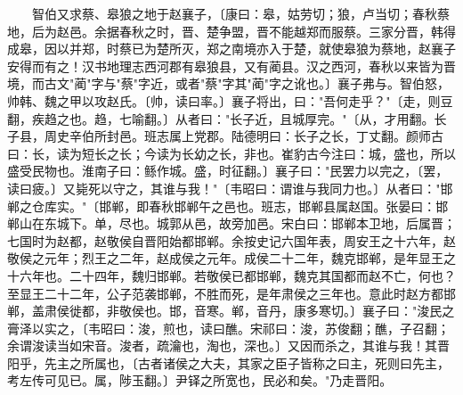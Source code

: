 　　智伯又求蔡、皋狼之地于赵襄子，〔康曰：皋，姑劳切；狼，卢当切；春秋蔡地，后为赵邑。余据春秋之时，晋、楚争盟，晋不能越郑而服蔡。三家分晋，韩得成皋，因以并郑，时蔡已为楚所灭，郑之南境亦入于楚，就使皋狼为蔡地，赵襄子安得而有之！汉书地理志西河郡有皋狼县，又有蔺县。汉之西河，春秋以来皆为晋境，而古文"蔺"字与"蔡"字近，或者"蔡"字其"蔺"字之讹也。〕襄子弗与。智伯怒，帅韩、魏之甲以攻赵氏。〔帅，读曰率。〕襄子将出，曰："吾何走乎？"〔走，则豆翻，疾趋之也。趋，七喻翻。〕从者曰："长子近，且城厚完。"〔从，才用翻。长子县，周史辛伯所封邑。班志属上党郡。陆德明曰：长子之长，丁丈翻。颜师古曰：长，读为短长之长；今读为长幼之长，非也。崔豹古今注曰：城，盛也，所以盛受民物也。淮南子曰：鲧作城。盛，时征翻。〕襄子曰："民罢力以完之，〔罢，读曰疲。〕又毙死以守之，其谁与我！"〔韦昭曰：谓谁与我同力也。〕从者曰："邯郸之仓库实。"〔邯郸，即春秋邯郸午之邑也。班志，邯郸县属赵国。张晏曰：邯郸山在东城下。单，尽也。城郭从邑，故旁加邑。宋白曰：邯郸本卫地，后属晋；七国时为赵都，赵敬侯自晋阳始都邯郸。余按史记六国年表，周安王之十六年，赵敬侯之元年；烈王之二年，赵成侯之元年。成侯二十二年，魏克邯郸，是年显王之十六年也。二十四年，魏归邯郸。若敬侯已都邯郸，魏克其国都而赵不亡，何也？至显王二十二年，公子范袭邯郸，不胜而死，是年肃侯之三年也。意此时赵方都邯郸，盖肃侯徙都，非敬侯也。邯，音寒。郸，音丹，康多寒切。〕襄子曰："浚民之膏泽以实之，〔韦昭曰：浚，煎也，读曰醮。宋祁曰：浚，苏俊翻；醮，子召翻；余谓浚读当如宋音。浚者，疏瀹也，淘也，深也。〕又因而杀之，其谁与我！其晋阳乎，先主之所属也，〔古者诸侯之大夫，其家之臣子皆称之曰主，死则曰先主，考左传可见已。属，陟玉翻。〕尹铎之所宽也，民必和矣。"乃走晋阳。

